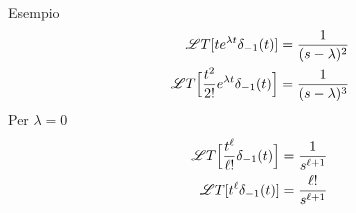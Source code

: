 \begin{enumerate}
\[\begin{split}
            \end{split}
         \]
         Esempio
         \[
            \begin{split}
               \mathscr{L}T[te^{\lambda t}\delta_{-1}(t)] = \frac{1}{(s - \lambda)^{2}}\\
               \mathscr{L}T\Bigl[\frac{t^2}{2!}e^{\lambda t}\delta_{-1}(t)\Bigr] = \frac{1}{(s - \lambda)^{3}}
            \end{split}
         \]
         Per $\lambda = 0$
         \[
            \begin{split}
               \mathscr{L}T\Bigl[\frac{t^\ell}{\ell!}\delta_{-1}(t)\Bigr] = \frac{1}{s^{\ell + 1}}\\
               \mathscr{L}T[t^\ell\delta_{-1}(t)] = \frac{\ell!}{s^{\ell + 1}}
            \end{split}
         \]
   \end{enumerate}
